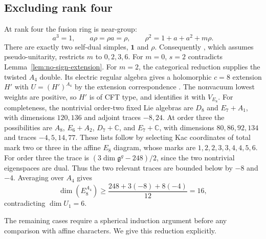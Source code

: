 \subsection{Excluding rank four}

At rank four the fusion ring is near-group:
\[
 a^3=1,\qquad a\rho=\rho a=\rho,\qquad
 \rho^2=1+a+a^2+m\rho.
\]
There are exactly two self-dual simples, $\mathbf1$ and $\rho$.
Consequently \cite[Theorem~1.1]{Larson}, which assumes
pseudo-unitarity, restricts $m$ to $0,2,3,6$.
For $m=0$, $s=2$ contradicts Lemma~\ref{lem:no-sign-extension}.
For $m=2$, the categorical reduction
\cite[Theorem~7.1 and Corollary~7.4]{EGO} supplies the twisted $A_4$ double.
Its electric regular algebra gives a holomorphic $c=8$ extension
$H'$ with $U=(H')^{A_4}$ by the extension correspondence
\cite{HKL}. The nonvacuum lowest weights are positive, so $H'$ is
of CFT type, and \cite[Theorem~1]{DM} identifies it with $V_{E_8}$.
For completeness, the nontrivial order-two fixed Lie algebras are
$D_8$ and $E_7+A_1$, with dimensions $120,136$ and adjoint traces
$-8,24$. At order three the possibilities are
$A_8$, $E_6+A_2$, $D_7+\mathbb C$, and $E_7+\mathbb C$,
with dimensions $80,86,92,134$ and traces $-4,5,14,77$.
These lists follow by selecting Kac coordinates of total mark two
or three in the affine $E_8$ diagram, whose marks are
$1,2,2,3,3,4,4,5,6$. For order three the trace is
$(3\dim\mathfrak g^g-248)/2$, since the two nontrivial eigenspaces
are dual. Thus the two relevant traces are bounded below by $-8$
and $-4$. Averaging over $A_4$ gives
\[
 \dim(E_8^{A_4})\ge\frac{248+3(-8)+8(-4)}{12}=16,
\]
contradicting $\dim U_1=6$.

The remaining cases require a spherical induction argument before any
comparison with affine characters. We give this reduction explicitly.

